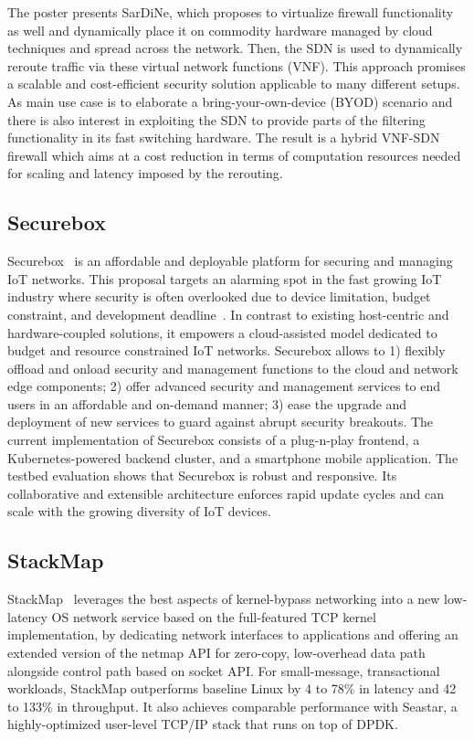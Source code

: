 The poster presents SarDiNe, which proposes to virtualize firewall
functionality as well and dynamically place it on commodity hardware managed
by cloud techniques and spread across the network. Then, the SDN is used to
dynamically reroute traffic via these virtual network functions (VNF). This
approach promises a scalable and cost-efficient security solution applicable to
many different setups. As main use case is to elaborate a
bring-your-own-device (BYOD) scenario and there is also interest in exploiting
the \ac{SDN} to provide parts of the filtering functionality in its fast
switching hardware. The result is a hybrid VNF-SDN firewall which aims at a
cost reduction in terms of computation resources needed for scaling and
latency imposed by the rerouting.

\subsection{Securebox}

Securebox~\cite{hafeez:s3:2015, hafeez:can:2016} is an affordable and
deployable platform for securing and managing IoT networks. This proposal
targets an alarming spot in the fast growing IoT industry where security is
often overlooked due to device limitation, budget constraint, and development
deadline~\cite{haus:comst:2017}.  In contrast to existing host-centric and
hardware-coupled solutions, it empowers a cloud-assisted model dedicated to
budget and resource constrained IoT networks. Securebox allows to 1) flexibly
offload and onload security and management functions to the cloud and network
edge components; 2) offer advanced security and management services to end
users in an affordable and on-demand manner; 3) ease the upgrade and
deployment of new services to guard against abrupt security breakouts. The
current implementation of Securebox consists of a plug-n-play frontend, a
Kubernetes-powered backend cluster, and a smartphone mobile application. The
testbed evaluation shows that Securebox is robust and responsive. Its
collaborative and extensible architecture enforces rapid update cycles and can
scale with the growing diversity of IoT devices.

\subsection{StackMap}

StackMap~\cite{kyasukata:atc:2016} leverages the best aspects of kernel-bypass
networking into a new low-latency OS network service based on the
full-featured TCP kernel implementation, by dedicating network interfaces to
applications and offering an extended version of the netmap API for zero-copy,
low-overhead data path alongside control path based on socket API\@. For
small-message, transactional workloads, StackMap outperforms baseline Linux by
4 to 78\% in latency and 42 to 133\% in throughput.  It also achieves
comparable performance with Seastar, a highly-optimized user-level TCP/IP
stack that runs on top of DPDK\@.

